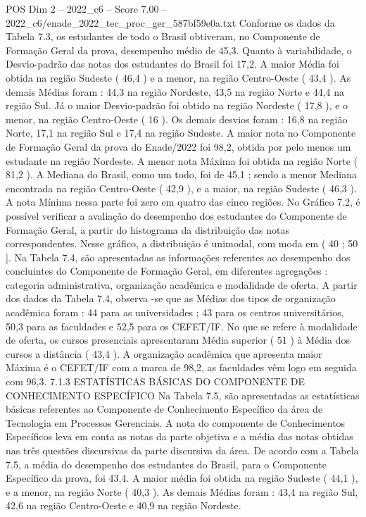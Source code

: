\begin{textsample}{POS Dim 2 – 2022\_c6 – Score 7.00 – 2022\_c6/enade\_2022\_tec\_proc\_ger\_587bf59e0a.txt}
Conforme os dados da Tabela 7.3, os estudantes de todo o Brasil obtiveram, no Componente de Formação Geral da prova, desempenho médio de 45,3.
Quanto à variabilidade, o Desvio-padrão das notas dos estudantes do Brasil foi 17,2.
A maior Média foi obtida na região Sudeste ( 46,4 ) e a menor, na região Centro-Oeste ( 43,4 ).
As demais Médias foram : 44,3 na região Nordeste, 43,5 na região Norte e 44,4 na região Sul.
Já o maior Desvio-padrão foi obtido na região Nordeste ( 17,8 ), e o menor, na região Centro-Oeste ( 16 ).
Os demais desvios foram : 16,8 na região Norte, 17,1 na região Sul e 17,4 na região Sudeste.
A maior nota no Componente de Formação Geral da prova do Enade/2022 foi 98,2, obtida por pelo menos um estudante na região Nordeste.
A menor nota Máxima foi obtida na região Norte ( 81,2 ).
A Mediana do Brasil, como um todo, foi de 45,1 ; sendo a menor Mediana encontrada na região Centro-Oeste ( 42,9 ), e a maior, na região Sudeste ( 46,3 ).
A nota Mínima nessa parte foi zero em quatro das cinco regiões.
No Gráfico 7.2, é possível verificar a avaliação do desempenho dos estudantes do Componente de Formação Geral, a partir do histograma da distribuição das notas correspondentes.
Nesse gráfico, a distribuição é unimodal, com moda em ( 40 ; 50 ].
Na Tabela 7.4, são apresentadas as informações referentes ao desempenho dos concluintes do Componente de Formação Geral, em diferentes agregações : categoria administrativa, organização acadêmica e modalidade de oferta.
A partir dos dados da Tabela 7.4, observa -se que as Médias dos tipos de organização acadêmica foram : 44 para as universidades ; 43 para os centros universitários, 50,3 para as faculdades e 52,5 para os CEFET/IF.
No que se refere à modalidade de oferta, os cursos presenciais apresentaram Média superior ( 51 ) à Média dos cursos a distância ( 43,4 ).
A organização acadêmica que apresenta maior Máxima é o CEFET/IF com a marca de 98,2, as faculdades vêm logo em seguida com 96,3. 7.1.3 ESTATÍSTICAS BÁSICAS DO COMPONENTE DE CONHECIMENTO ESPECÍFICO Na Tabela 7.5, são apresentadas as estatísticas básicas referentes ao Componente de Conhecimento Específico da área de Tecnologia em Processos Gerenciais.
A nota do componente de Conhecimentos Específicos leva em conta as notas da parte objetiva e a média das notas obtidas nas três questões discursivas da parte discursiva da área.
De acordo com a Tabela 7.5, a média do desempenho dos estudantes do Brasil, para o Componente Específico da prova, foi 43,4.
A maior média foi obtida na região Sudeste ( 44,1 ), e a menor, na região Norte ( 40,3 ).
As demais Médias foram : 43,4 na região Sul, 42,6 na região Centro-Oeste e 40,9 na região Nordeste.

\end{textsample}
